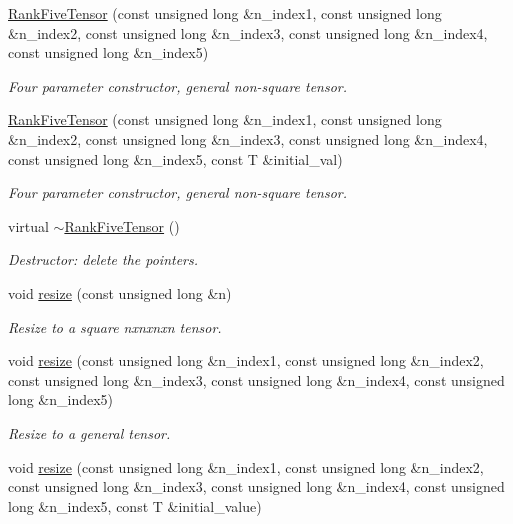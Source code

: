 \begin{DoxyCompactItemize}
\hyperlink{classoomph_1_1RankFiveTensor_af7e765aecc61bca8ad9742e07822c54f}{Rank\+Five\+Tensor} (const unsigned long \&n\+\_\+index1, const unsigned long \&n\+\_\+index2, const unsigned long \&n\+\_\+index3, const unsigned long \&n\+\_\+index4, const unsigned long \&n\+\_\+index5)
\begin{DoxyCompactList}\small\item\em Four parameter constructor, general non-\/square tensor. \end{DoxyCompactList}\item 
\hyperlink{classoomph_1_1RankFiveTensor_a79ebab81e4e9f7fdd193f59a4858930c}{Rank\+Five\+Tensor} (const unsigned long \&n\+\_\+index1, const unsigned long \&n\+\_\+index2, const unsigned long \&n\+\_\+index3, const unsigned long \&n\+\_\+index4, const unsigned long \&n\+\_\+index5, const T \&initial\+\_\+val)
\begin{DoxyCompactList}\small\item\em Four parameter constructor, general non-\/square tensor. \end{DoxyCompactList}\item 
virtual \hyperlink{classoomph_1_1RankFiveTensor_aee507ed9367b053bcf538b3eaaf62d03}{$\sim$\+Rank\+Five\+Tensor} ()
\begin{DoxyCompactList}\small\item\em Destructor\+: delete the pointers. \end{DoxyCompactList}\item 
void \hyperlink{classoomph_1_1RankFiveTensor_a8d0f38a3627c9d07dbf1106a26f61578}{resize} (const unsigned long \&n)
\begin{DoxyCompactList}\small\item\em Resize to a square nxnxnxn tensor. \end{DoxyCompactList}\item 
void \hyperlink{classoomph_1_1RankFiveTensor_afdd04cd2a29fb7b8c41f5300200813e1}{resize} (const unsigned long \&n\+\_\+index1, const unsigned long \&n\+\_\+index2, const unsigned long \&n\+\_\+index3, const unsigned long \&n\+\_\+index4, const unsigned long \&n\+\_\+index5)
\begin{DoxyCompactList}\small\item\em Resize to a general tensor. \end{DoxyCompactList}\item 
void \hyperlink{classoomph_1_1RankFiveTensor_a80eeaef66e9252fa5d1d7031e4ec402c}{resize} (const unsigned long \&n\+\_\+index1, const unsigned long \&n\+\_\+index2, const unsigned long \&n\+\_\+index3, const unsigned long \&n\+\_\+index4, const unsigned long \&n\+\_\+index5, const T \&initial\+\_\+value)

\end{DoxyCompactItemize}
